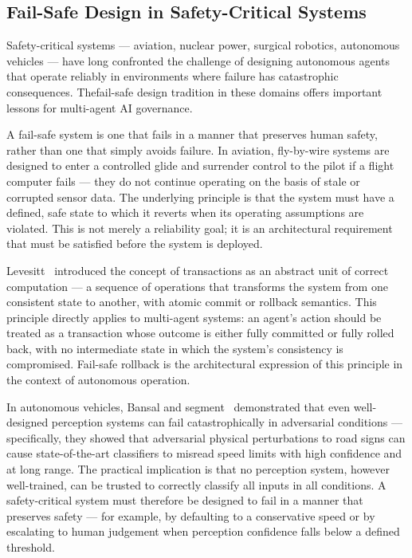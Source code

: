 \subsection{Fail-Safe Design in Safety-Critical Systems}
\label{sec:failsafe}

Safety-critical systems — aviation, nuclear power, surgical robotics, autonomous vehicles — have long confronted the challenge of designing autonomous agents that operate reliably in environments where failure has catastrophic consequences. Thefail-safe design tradition in these domains offers important lessons for multi-agent AI governance.

A fail-safe system is one that fails in a manner that preserves human safety, rather than one that simply avoids failure. In aviation, fly-by-wire systems are designed to enter a controlled glide and surrender control to the pilot if a flight computer fails — they do not continue operating on the basis of stale or corrupted sensor data. The underlying principle is that the system must have a defined, safe state to which it reverts when its operating assumptions are violated. This is not merely a reliability goal; it is an architectural requirement that must be satisfied before the system is deployed.

Levesitt~\cite{tristr81} introduced the concept of transactions as an abstract unit of correct computation — a sequence of operations that transforms the system from one consistent state to another, with atomic commit or rollback semantics. This principle directly applies to multi-agent systems: an agent's action should be treated as a transaction whose outcome is either fully committed or fully rolled back, with no intermediate state in which the system's consistency is compromised. Fail-safe rollback is the architectural expression of this principle in the context of autonomous operation.

In autonomous vehicles, Bansal and segment~\cite{bansal2019} demonstrated that even well-designed perception systems can fail catastrophically in adversarial conditions — specifically, they showed that adversarial physical perturbations to road signs can cause state-of-the-art classifiers to misread speed limits with high confidence and at long range. The practical implication is that no perception system, however well-trained, can be trusted to correctly classify all inputs in all conditions. A safety-critical system must therefore be designed to fail in a manner that preserves safety — for example, by defaulting to a conservative speed or by escalating to human judgement when perception confidence falls below a defined threshold.

